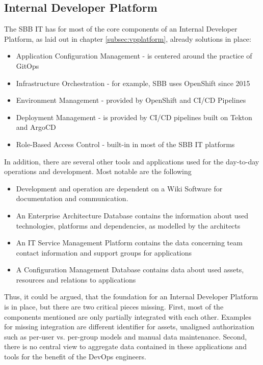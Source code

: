 \documentclass[a4paper,12pt]{article}
\begin{document}
    \subsection{Internal Developer Platform}
    \label{subsec:sbbplatform}
    The SBB IT has for most of the core components of an Internal Developer Platform, as laid out in chapter \ref{subsec:vpplatform},
    already solutions in place:
    \begin{itemize}
        \item Application Configuration Management - is centered around the practice of GitOps\parencite{hashicorpvault}
        \item Infrastructure Orchestration - for example, SBB uses OpenShift since 2015\parencite{rhsbbopenshift}
        \item Environment Management - provided by OpenShift and CI/CD Pipelines
        \item Deployment Management - is provided by CI/CD pipelines built on Tekton and ArgoCD\parencite{sbbtekton}
        \item Role-Based Access Control - built-in in most of the SBB IT platforms
    \end{itemize}
    In addition, there are several other tools and applications used for the day-to-day operations and development.
    Most notable are the following
    \begin{itemize}
        \item Development and operation are dependent on a Wiki Software for documentation and communication.
        \item An Enterprise Architecture Database contains the information about used technologies, platforms and
        dependencies, as modelled by the architects
        \item An IT Service Management Platform contains the data concerning team contact information and support groups for applications
        \item A Configuration Management Database contains data about used assets, resources and relations to applications
    \end{itemize}
    Thus, it could be argued, that the foundation for an Internal Developer Platform is in place, but there are two
    critical pieces missing.
    First, most of the components mentioned are only partially integrated with each other.
    Examples for missing integration are different identifier for assets, unaligned authorization such as per-user vs.
    per-group models and manual data maintenance.
    Second, there is no central view to aggregate data contained in these applications and tools for the benefit of
    the DevOps engineers.
\end{document}
